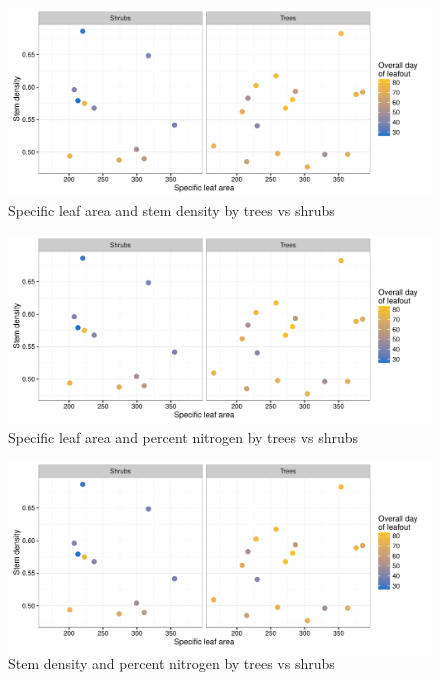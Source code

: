 \documentclass{article}
\begin{document}
\begin{figure}
\caption{Specific leaf area and stem density by trees vs shrubs}
\label{figS8}
\includegraphics[scale=0.95, page=1]{Tree_shrub_traits}
\end{figure}


\begin{figure}
\caption{Specific leaf area and percent nitrogen by trees vs shrubs}
\label{figS9}
\includegraphics[scale=0.95, page=2]{Tree_shrub_traits}
\end{figure}

\begin{figure}
\caption{Stem density and percent nitrogen by trees vs shrubs}
\label{figS10}
\includegraphics[scale=0.95, page=3]{Tree_shrub_traits}
\end{figure}
\end{document}
